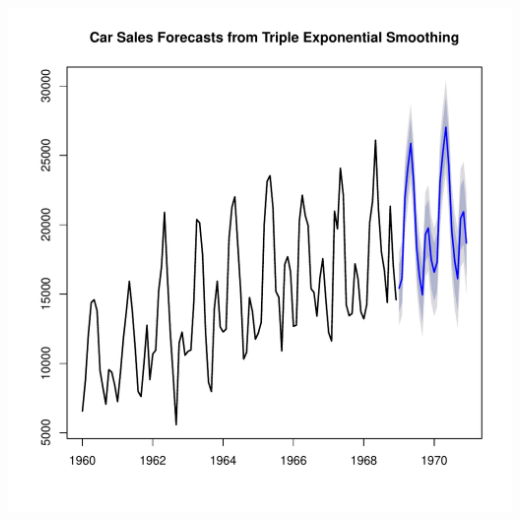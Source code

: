 \documentclass[10pt]{article}\usepackage[]{graphicx}\usepackage[]{color}
\makeatletter
\def\maxwidth{ %
  \ifdim\Gin@nat@width>\linewidth
    \linewidth
  \else
    \Gin@nat@width
  \fi
}
\newenvironment{knitrout}{}{} %
\makeatother
\begin{document}
\begin{knitrout}
\includegraphics[width=\maxwidth]{figure/unnamed-chunk-37-1} 

\end{knitrout}
\end{document}
